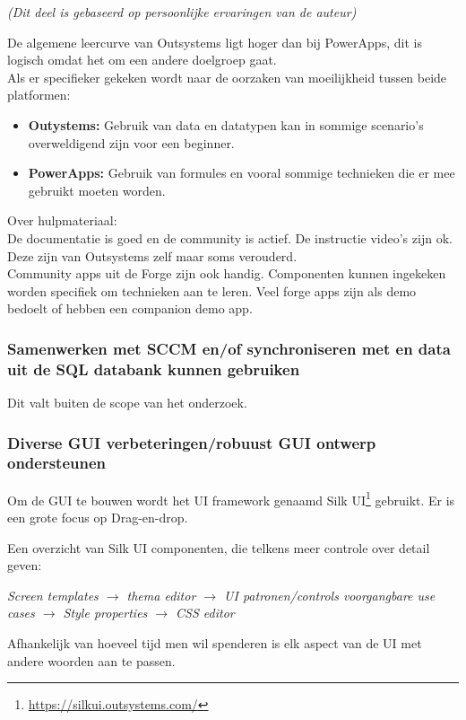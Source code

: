 \textit{(Dit deel is gebaseerd op persoonlijke ervaringen van de auteur)}

De algemene leercurve van Outsystems ligt hoger dan bij PowerApps, dit is logisch omdat het om een andere doelgroep gaat.\\
Als er specifieker gekeken wordt naar de oorzaken van moeilijkheid tussen beide platformen:
\begin{itemize}
    \item \textbf{Outystems:} Gebruik van data en datatypen kan in sommige scenario's overweldigend zijn voor een beginner.
    \item \textbf{PowerApps:} Gebruik van formules en vooral sommige technieken die er mee gebruikt moeten worden.
\end{itemize}

Over hulpmateriaal:\\
De documentatie is goed en de community is actief. De instructie video's zijn ok. Deze zijn van Outsystems zelf maar soms verouderd.\\
Community apps uit de Forge zijn ook handig. Componenten kunnen ingekeken worden specifiek om technieken aan te leren. Veel forge apps zijn als demo bedoelt of hebben een companion demo app.

\subsubsection{Samenwerken met SCCM en/of synchroniseren met en data uit de SQL databank kunnen gebruiken}

Dit valt buiten de scope van het onderzoek.

\subsubsection{Diverse GUI verbeteringen/robuust GUI ontwerp ondersteunen}

Om de GUI te bouwen wordt het UI framework genaamd Silk UI\footnote{\url{https://silkui.outsystems.com/}} gebruikt. Er is een grote focus op Drag-en-drop.

Een overzicht van Silk UI componenten, die telkens meer controle over detail geven:

\textit{Screen templates $\rightarrow$ thema editor $\rightarrow$ UI patronen/controls voorgangbare use cases $\rightarrow$ Style properties $\rightarrow$ CSS editor}

Afhankelijk van hoeveel tijd men wil spenderen is elk aspect van de UI met andere woorden aan te passen.


